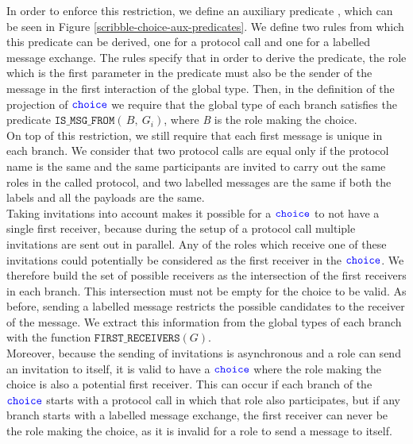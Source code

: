 \documentclass[12pt,twoside]{report}
\begin{document}
In order to enforce this restriction, we define an auxiliary predicate \texttt{}, which can be seen in Figure \ref{scribble-choice-aux-predicates}. We define two rules from which this predicate can be derived, one for a protocol call and one for a labelled message exchange. The rules specify that in order to derive the predicate, the role which is the first parameter in the predicate must also be the sender of the message in the first interaction of the global type. Then, in the definition of the projection of ${\color{blue}\mathtt{choice}}$ we require that the global type of each branch satisfies the predicate $\mathtt{IS\_MSG\_FROM}(\,B,\ G_i)$, where \textit{B} is the role making the choice.\\

On top of this restriction, we still require that each first message is unique in each branch. We consider that two protocol calls are equal only if the protocol name is the same and the same participants are invited to carry out the same roles in the called protocol, and two labelled messages are the same if both the labels and all the payloads are the same.\\

Taking invitations into account makes it possible for a ${\color{blue}\mathtt{choice}}$ to not have a single first receiver, because during the setup of a protocol call multiple invitations are sent out in parallel. Any of the roles which receive one of these invitations could potentially be considered as the first receiver in the ${\color{blue}\mathtt{choice}}$. We therefore build the set of possible receivers as the intersection of the first receivers in each branch. This intersection must not be empty for the choice to be valid. As before, sending a labelled message restricts the possible candidates to the receiver of the message. We extract this information from the global types of each branch with the function $\mathtt{FIRST\_RECEIVERS}(G)$.\\

Moreover, because the sending of invitations is asynchronous and a role can send an invitation to itself, it is valid to have a ${\color{blue}\mathtt{choice}}$ where the role making the choice is also a potential first receiver. This can occur if each branch of the ${\color{blue}\mathtt{choice}}$ starts with a protocol call in which that role also participates, but if any branch starts with a labelled message exchange, the first receiver can never be the role making the choice, as it is invalid for a role to send a message to itself.\\
\end{document}
